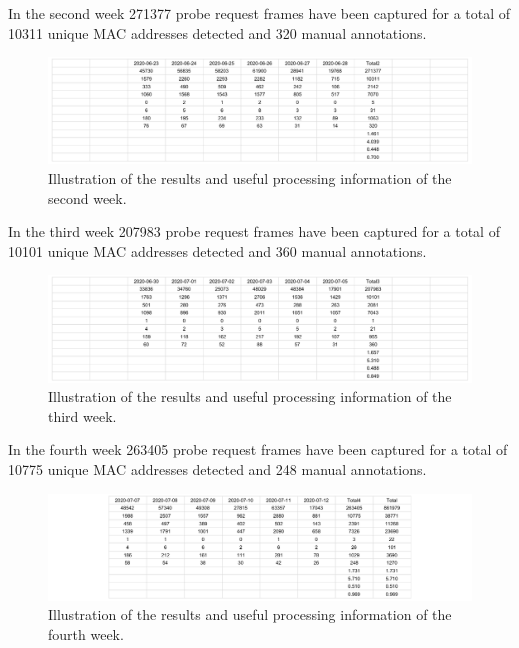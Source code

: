 In the second week 271377 probe request frames have been captured for a total of 10311 unique MAC addresses detected and 320 manual annotations.

\begin{figure}[H]
\centering 
\includegraphics[width=1\textwidth]{images/testresults2} 
\caption{Illustration of the results and useful processing information of the second week.}
\label{fig:testresults2}
\end{figure}

In the third week 207983 probe request frames have been captured for a total of 10101 unique MAC addresses detected and 360 manual annotations.

\begin{figure}[H]
\centering 
\includegraphics[width=1\textwidth]{images/testresults3} 
\caption{Illustration of the results and useful processing information of the third week.}
\label{fig:testresults3}
\end{figure}

In the fourth week 263405 probe request frames have been captured for a total of 10775 unique MAC addresses detected and 248 manual annotations.

\begin{figure}[H]
\centering 
\includegraphics[width=1\textwidth]{images/testresults4} 
\caption{Illustration of the results and useful processing information of the fourth week.}
\label{fig:testresults4}
\end{figure}

